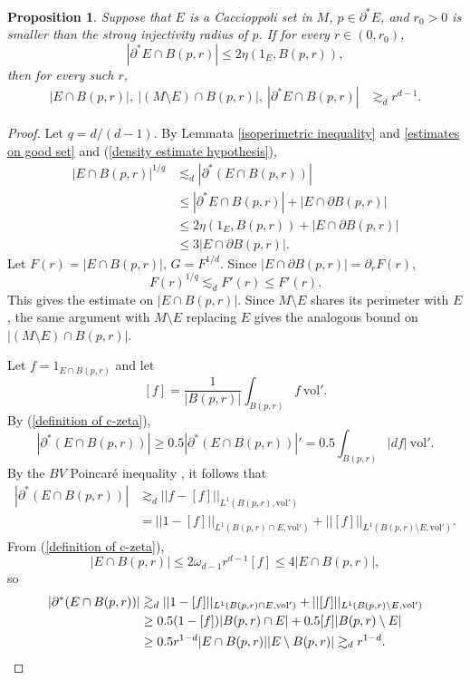 \documentclass[reqno,12pt,letterpaper]{amsart}
\newcommand{\vol}{\mathrm{vol}}
\newtheorem{proposition}[theorem]{Proposition}
\theoremstyle{definition}
\numberwithin{equation}{section}
\begin{document}
\begin{proposition}\label{uniform density estimate}
Suppose that $E$ is a Caccioppoli set in $M$, $p \in \partial^* E$, and $r_0 > 0$ is smaller than the strong injectivity radius of $p$.
If for every $r \in (0, r_0)$,
\begin{equation}\label{density estimate hypothesis}
|\partial^* E \cap B(p, r)| \leq 2\eta(1_E, B(p, r)),
\end{equation}
then for every such $r$,
\begin{align*}|E \cap B(p, r)|, ~|(M \setminus E) \cap B(p, r)|, ~|\partial^* E \cap B(p, r)| &\gtrsim_d r^{d - 1}.\end{align*}
\end{proposition}
\begin{proof}
Let $q = d/(d-1)$. By Lemmata \ref{isoperimetric inequality} and \ref{estimates on good set} and (\ref{density estimate hypothesis}),
\begin{align*}
|E \cap B(p, r)|^{1/q} &\lesssim_d |\partial^*(E \cap B(p, r))| \\
&\leq |\partial^* E \cap B(p, r)| + |E \cap \partial B(p, r)|\\
&\leq 2\eta(1_E, B(p, r)) +  |E \cap \partial B(p, r)|\\
&\leq 3 |E \cap \partial B(p, r)|.
\end{align*}
Let $F(r) = |E \cap B(p, r)|$, $G = F^{1/d}$.
Since $|E \cap \partial B(p, r)| = \partial_r F(r)$,
$$F(r)^{1/q} \lesssim_d F'(r) \leq F'(r).$$
This gives the estimate on $|E \cap B(p, r)|$.
Since $M \setminus E$ shares its perimeter with $E$, the same argument with $M \setminus E$ replacing $E$ gives the analogous bound on $|(M \setminus E) \cap B(p, r)|$.

Let $f = 1_{E \cap B(p, r)}$ and let
$$[f] = \frac{1}{|B(p, r)|} \int_{B(p, r)} f ~\vol'.$$
By (\ref{definition of c-zeta}),
$$|\partial^* (E \cap B(p, r))| \geq 0.5 |\partial^* (E \cap B(p, r))|' = 0.5 \int_{B(p, r)} |df| ~\vol'.$$
By the $BV$ Poincar\'e inequality \cite[\S5.6.1]{evans1991measure}, it follows that
\begin{align*}
|\partial^* (E \cap B(p, r))| &\gtrsim_d ||f - [f]||_{L^1(B(p, r), \vol')} \\
&= ||1 - [f]||_{L^1(B(p, r) \cap E, \vol')} + ||[f]||_{L^1(B(p, r) \setminus E, \vol')}.
\end{align*}
From (\ref{definition of c-zeta}),
$$|E \cap B(p, r)| \leq 2\omega_{d - 1} r^{d - 1} [f] \leq 4|E \cap B(p, r)|,$$
so
\begin{align*}
|\partial^* (E \cap B(p, r))| &\gtrsim_d ||1 - [f]||_{L^1(B(p, r) \cap E, \vol')} + ||[f]||_{L^1(B(p, r) \setminus E, \vol')}\\
&\geq 0.5 (1 - [f]) |B(p, r) \cap E| + 0.5 [f] |B(p, r) \setminus E|\\
&\geq 0.5 r^{1-d}|E \cap B(p, r)||E \setminus B(p, r)| \gtrsim_d r^{1 - d}. \qedhere
\end{align*}
\end{proof}
\end{document}
